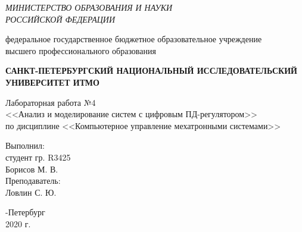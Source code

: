 \begin{titlepage}
	\begin{center}
		\textit{МИНИСТЕРСТВО ОБРАЗОВАНИЯ И НАУКИ\\
			РОССИЙСКОЙ ФЕДЕРАЦИИ}
		\vspace{1ex}

		федеральное государственное бюджетное образовательное учреждение\\
		высшего профессионального образования
		\vspace{1ex}

		\textbf{САНКТ-ПЕТЕРБУРГСКИЙ НАЦИОНАЛЬНЫЙ ИССЛЕДОВАТЕЛЬСКИЙ УНИВЕРСИТЕТ ИТМО}
		\vspace{13ex}

		Лабораторная работа №4\\
		<<Анализ и моделирование систем с цифровым ПД-регулятором>>\\
		по дисциплине <<Компьютерное управление мехатронными системами>>\\
	\end{center}
	\vspace{15em}
	\begin{flushright}
		\noindent
		Выполнил:\\
		студент гр. R3425\\
		Борисов М. В.\\
		Преподаватель:\\
		Ловлин С. Ю.
	\end{flushright}
	\vfill
	\begin{center}
		-Петербург\\
		2020 г.\\
	\end{center}
\end{titlepage}

